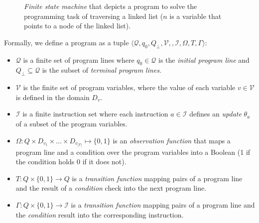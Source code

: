\documentclass[10pt,a4paper]{paper}
\newcommand{\tup}[1]{{\langle #1 \rangle}}
\begin{document}
\begin{figure}[hbt!]
\begin{center}
\end{center}
\caption{\small {\em Finite state machine} that depicts a program to solve the programming task of traversing a linked list ($n$ is a variable that points to a node of the linked list).}
\label{fig:list}
\end{figure}

Formally, we define a program as a tuple $\tup{\mathcal{Q},q_0,Q_\bot,\mathcal{V},,\mathcal{I},\Omega,T,\Gamma}$:
\begin{itemize}
\item $\mathcal{Q}$ is a finite set of program lines where $q_0\in \mathcal{Q}$ is the {\em initial program line} and $Q_\bot\subseteq \mathcal{Q}$ is the subset of {\em terminal program lines}.
\item $\mathcal{V}$ is the finite set of program variables, where the value of each variable $v\in\mathcal{V}$ is defined in the domain $D_v$.
\item $\mathcal{I}$ is a finite instruction set where each instruction $a\in \mathcal{I}$ defines an {\em update} $\theta_a$ of a subset of the program variables.
\item $\Omega:Q\times D_{v_1}\times \ldots \times D_{v_{|\mathcal{V}|}}\mapsto\{0,1\}$ is an {\em observation function} that maps a program line and a condition over the program variables into a Boolean (1 if the condition holds 0 if  it does not). 
\item $T:Q\times\{0,1\}\rightarrow Q$ is a {\em transition function} mapping pairs of a program line and the result of a {\em condition} check into the next program line.
\item $\Gamma:Q\times\{0,1\}\rightarrow \mathcal{I}$ is a {\em transition function} mapping pairs of a program line and the {\em condition} result into the corresponding instruction.
\end{itemize}
\end{document}
